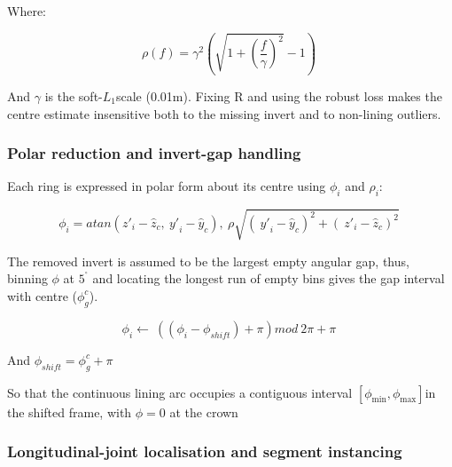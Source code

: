 \documentclass[preprint,12pt,authoryear]{elsarticle}
\begin{document}
Where:


\begin{equation}
  \rho(f) = \gamma^{2}\left( \sqrt{{1 + \left( \frac{f}{\gamma} \right)}^{2}} - 1 \right)\
  \label{eq:09}
\end{equation}


And \(\gamma\) is the soft-\(L_{1}\)scale (0.01m). Fixing R and using
the robust loss makes the centre estimate insensitive both to the
missing invert and to non-lining outliers.

\subsubsection{Polar reduction and invert-gap handling}\label{polar-reduction-and-invert-gap-handling}

Each ring is expressed in polar form about its centre using \(\phi_{i}\)
and \(\rho_{i}\):

\begin{equation}
  \phi_{i} = {atan}\left( {z'}_{i} - {\widehat{z}}_{c},\ {y'}_{i} - {\widehat{y}}_{c} \right),\ \rho\sqrt{\left( \ {y'}_{i} - {\widehat{y}}_{c} \right)^{2} + \left( \ {z'}_{i} - {\widehat{z}}_{c} \right)^{2}}\
  \label{eq:10}
\end{equation}

The removed invert is assumed to be the largest empty angular gap, thus,
binning \(\phi\) at \(5^{{^\circ}}\) and locating the longest run of
empty bins gives the gap interval with centre (\(\phi_{g}^{c}\)).

\begin{equation}
  \phi_{i} \leftarrow \ \left( \left( \phi_{i} - \phi_{shift} \right) + \pi \right)mod\ 2\pi + \pi\
  \label{eq:11}
\end{equation}

And \(\phi_{shift} = \phi_{g}^{c} + \pi\)

So that the continuous lining arc occupies a contiguous interval
\(\left\lbrack \phi_{\min},\phi_{\max} \right\rbrack\)in the shifted
frame, with \(\phi = 0\) at the crown

\subsubsection{Longitudinal-joint localisation and segment instancing} \label{longitudinal-joint-localisation-and-segment-instancing}
\end{document}
